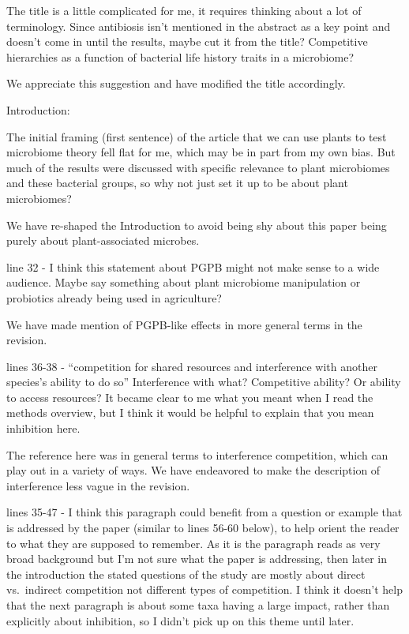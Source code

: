 \documentclass[11pt,]{article}
\begin{document}
\begin{blockquote}
The title is a little complicated for me, it requires thinking about a
lot of terminology. Since antibiosis isn't mentioned in the abstract as
a key point and doesn't come in until the results, maybe cut it from the
title? Competitive hierarchies as a function of bacterial life history
traits in a microbiome?
\end{blockquote}

We appreciate this suggestion and have modified the title accordingly.

\begin{blockquote}
Introduction:
\end{blockquote}

\begin{blockquote}
The initial framing (first sentence) of the article that we can use
plants to test microbiome theory fell flat for me, which may be in part
from my own bias. But much of the results were discussed with specific
relevance to plant microbiomes and these bacterial groups, so why not
just set it up to be about plant microbiomes?
\end{blockquote}

We have re-shaped the Introduction to avoid being shy about this paper
being purely about plant-associated microbes.

\begin{blockquote}
line 32 - I think this statement about PGPB might not make sense to a
wide audience. Maybe say something about plant microbiome manipulation
or probiotics already being used in agriculture?
\end{blockquote}

We have made mention of PGPB-like effects in more general terms in the
revision.

\begin{blockquote}
lines 36-38 - ``competition for shared resources and interference with
another species's ability to do so'' Interference with what? Competitive
ability? Or ability to access resources? It became clear to me what you
meant when I read the methods overview, but I think it would be helpful
to explain that you mean inhibition here.
\end{blockquote}

The reference here was in general terms to interference competition,
which can play out in a variety of ways. We have endeavored to make the
description of interference less vague in the revision.

\begin{blockquote}
lines 35-47 - I think this paragraph could benefit from a question or
example that is addressed by the paper (similar to lines 56-60 below),
to help orient the reader to what they are supposed to remember. As it
is the paragraph reads as very broad background but I'm not sure what
the paper is addressing, then later in the introduction the stated
questions of the study are mostly about direct vs.~indirect competition
not different types of competition. I think it doesn't help that the
next paragraph is about some taxa having a large impact, rather than
explicitly about inhibition, so I didn't pick up on this theme until
later.
\end{blockquote}
\end{document}
